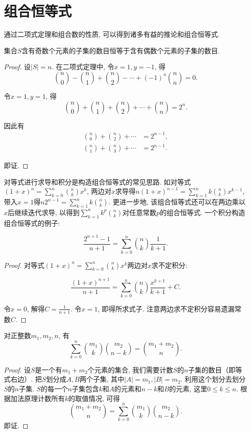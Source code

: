 \section{组合恒等式}
通过二项式定理和组合数的性质, 可以得到诸多有益的推论和组合恒等式.

\begin{corollary}
    \label{exstl1}
    集合\(S\)含有奇数个元素的子集的数目恒等于含有偶数个元素的子集的数目.
\end{corollary}
\begin{proof}
    设\(|S|=n\).   在二项式定理中, 令\(x=1, y=-1\), 得
    \[\binom{n}{0} - \binom{n}{1} + \binom{n}{2} - \cdots + (-1)^n \binom{n}{n} = 0 .  \]

    令\(x=1, y=1\), 得
    \[\binom{n}{0} + \binom{n}{1} + \binom{n}{2} + \cdots + \binom{n}{n} = 2^n.  \]

    因此有
    \begin{align*}
        \binom{n}{0} + \binom{n}{2} + \cdots & = 2^{n-1}, \\
        \binom{n}{1} + \binom{n}{3} + \cdots & = 2^{n-1}.
    \end{align*}

    即证.
\end{proof}

对等式进行求导和积分是构造组合恒等式的常见思路.  如对等式\((1 + x)^n = \sum_{k=0}^{n} \binom{n}{k} x^k\), 两边对\(x\)求导得\(n(1 + x)^{n-1} = \sum_{k=1}^{n} k \binom{n}{k} x^{k-1}\), 带入\(x=1\)得\(n 2^{n-1} = \sum_{k=1}^{n} k \binom{n}{k}\).  更进一步地, 该组合恒等式还可以在两边乘以\(x\)后继续迭代求导, 以得到\(\sum_{k=1}^{n} k^p \binom{n}{k}\)对任意常数\(p\)的组合恒等式.  一个积分构造组合恒等式的例子: 

\begin{corollary}
    $$\frac{2^{n+1}-1}{n+1} = \sum_{k=0}^{n} \binom{n}{k} \frac{1}{k+1}.  $$
\end{corollary}
\begin{proof}
    对等式\((1 + x)^n = \sum_{k=0}^{n} \binom{n}{k} x^k\)两边对\(x\)求不定积分: 

    \[\frac{(1+x)^{n+1}}{n+1} = \sum_{k=0}^{n} \binom{n}{k} \frac{x^{k+1}}{k+1} + C.  \]

    令\(x=0\), 解得\(C=\frac{1}{n+1}\).   令\(x=1\), 即得所求式子.  注意两边求不定积分容易遗漏常数\(C\).
\end{proof}

\begin{corollary}[范德蒙卷积公式]
    对正整数\(m_1,  m_2,  n\), 有
    \[\sum_{k=0}^{n} \binom{m_1}{k} \binom{m_2}{n-k} = \binom{m_1+m_2}{n}.  \]
\end{corollary}
\begin{proof}
    设\(S\)是一个有\(m_1+m_2\)个元素的集合, 我们需要计数\(S\)的\(n\)子集的数目（即等式右边）.  把\(S\)划分成\(A, B\)两个子集, 其中\(|A|=m_1, |B|=m_2\).  利用这个划分去划分\(S\)的\(n\)子集.  \(S\)的每一个\(n\)子集包含\(k\)和\(A\)的元素和\(n-k\)和\(B\)的元素, 这里\(0\leq k \leq n\).  根据加法原理计数所有\(k\)的取值情况, 可得
    \[\binom{m_1+m_2}{n}=\sum_{k=0}^{n} \binom{m_1}{k} \binom{m_2}{n-k} .  \]
    即证.
\end{proof}

